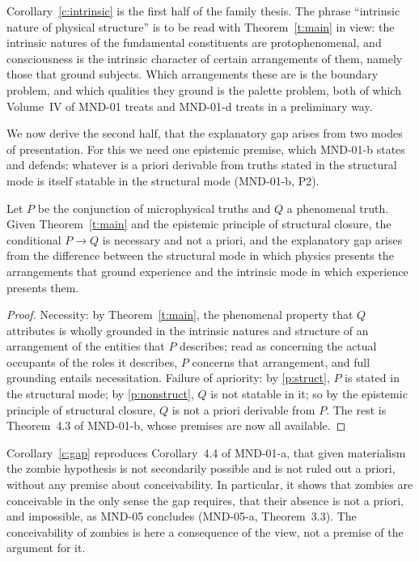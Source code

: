 \documentclass{situationist-preprint}
\begin{document}
Corollary~\ref{c:intrinsic} is the first half of the family thesis. The phrase \enquote{intrinsic nature of physical structure} is to be read with Theorem~\ref{t:main} in view: the intrinsic natures of the fundamental constituents are protophenomenal, and consciousness is the intrinsic character of certain arrangements of them, namely those that ground subjects. Which arrangements these are is the boundary problem, and which qualities they ground is the palette problem, both of which Volume~IV of MND-01 treats and MND-01-d treats in a preliminary way.

We now derive the second half, that the explanatory gap arises from two modes of presentation. For this we need one epistemic premise, which MND-01-b states and defends: whatever is a priori derivable from truths stated in the structural mode is itself statable in the structural mode (MND-01-b, P2).

\begin{corollary}\label{c:gap}
Let $P$ be the conjunction of microphysical truths and $Q$ a phenomenal truth. Given Theorem~\ref{t:main} and the epistemic principle of structural closure, the conditional $P \to Q$ is necessary and not a priori, and the explanatory gap arises from the difference between the structural mode in which physics presents the arrangements that ground experience and the intrinsic mode in which experience presents them.
\end{corollary}

\begin{proof}
Necessity: by Theorem~\ref{t:main}, the phenomenal property that $Q$ attributes is wholly grounded in the intrinsic natures and structure of an arrangement of the entities that $P$ describes; read as concerning the actual occupants of the roles it describes, $P$ concerns that arrangement, and full grounding entails necessitation. Failure of apriority: by \ref{p:struct}, $P$ is stated in the structural mode; by \ref{p:nonstruct}, $Q$ is not statable in it; so by the epistemic principle of structural closure, $Q$ is not a priori derivable from $P$. The rest is Theorem~4.3 of MND-01-b, whose premises are now all available.
\end{proof}

Corollary~\ref{c:gap} reproduces Corollary~4.4 of MND-01-a, that given materialism the zombie hypothesis is not secondarily possible and is not ruled out a priori, without any premise about conceivability. In particular, it shows that zombies are conceivable in the only sense the gap requires, that their absence is not a priori, and impossible, as MND-05 concludes (MND-05-a, Theorem~3.3). The conceivability of zombies is here a consequence of the view, not a premise of the argument for it.
\end{document}
